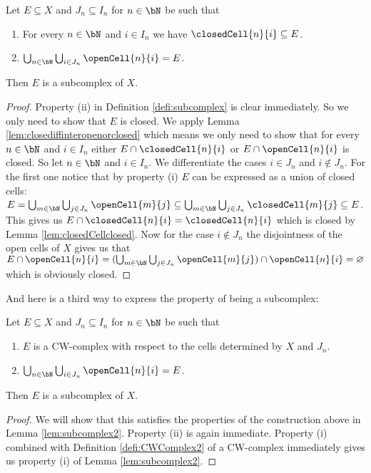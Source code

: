 \begin{lem} \label{lem:subcomplex2}
    Let $E \subseteq X$ and $J_n \subseteq I_n$ for $n \in \bN$ be such that 
    \begin{enumerate}
        \item For every $n \in \bN$ and $i \in I_n$ we have $\closedCell{n}{i} \subseteq E$. 
        \item $\bigcup_{n \in \bN} \bigcup_{i \in J_n} \openCell{n}{i} = E$.
    \end{enumerate}
    Then $E$ is a subcomplex of $X$.
\end{lem}
\begin{proof}
    Property (ii) in Definition \ref{defi:subcomplex} is clear immediately. 
    So we only need to show that $E$ is closed. 
    We apply Lemma \ref{lem:closediffinteropenorclosed} which means we only need to show that for every $n \in \bN$ and $i \in I_n$ either $E \cap \closedCell{n}{i}$ or $E \cap \openCell{n}{i}$ is closed. 
    So let $n \in \bN$ and $i \in I_n$. 
    We differentiate the cases $i \in J_n$ and $i \notin J_n$.
    For the first one notice that by property (i) $E$ can be expressed as a union of closed cells: $E = \bigcup_{m \in \bN} \bigcup_{j \in J_n} \openCell{m}{j} \subseteq \bigcup_{m \in \bN} \bigcup_{j \in J_n} \closedCell{m}{j} \subseteq E$. 
    This gives us $E \cap \closedCell{n}{i} = \closedCell{n}{i}$ which is closed by Lemma \ref{lem:closedCellclosed}. 
    Now for the case $i \notin J_n$ the disjointness of the open cells of $X$ gives us that $E \cap \openCell{n}{i} = (\bigcup_{m \in \bN} \bigcup_{j \in J_n} \openCell{m}{j}) \cap \openCell{n}{i} = \varnothing$ which is obviously closed. 
\end{proof}

And here is a third way to express the property of being a subcomplex:

\begin{lem}
    Let $E \subseteq X$ and $J_n \subseteq I_n$ for $n \in \bN$ be such that 
    \begin{enumerate}
        \item $E$ is a CW-complex with respect to the cells determined by $X$ and $J_n$.
        \item $\bigcup_{n \in \bN} \bigcup_{i \in J_n} \openCell{n}{i} = E$.
    \end{enumerate}
    Then $E$ is a subcomplex of $X$.
\end{lem}
\begin{proof}
    We will show that this satisfies the properties of the construction above in Lemma \ref{lem:subcomplex2}.
    Property (ii) is again immediate. 
    Property (i) combined with Definition \ref{defi:CWComplex2} of a CW-complex immediately gives us property (i) of Lemma \ref{lem:subcomplex2}.
\end{proof}

